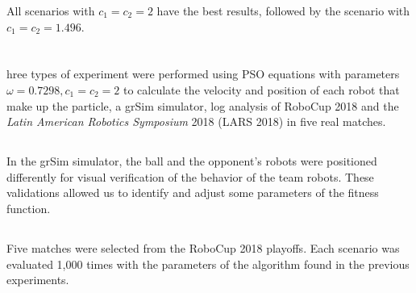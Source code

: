 \documentclass[a0,portrait]{sciposter}
\newcommand{\tituloA}[1]{\emph{\textbf{\color{white}{#1}}}}
\newcommand{\tituloB}[1]{\emph{\textbf{\color{blue}{#1}}}}
\begin{document}
\begin{multicols}{3}
    All scenarios with $c_1 = c_2 = 2$ have the best results, followed by the scenario with $c_1 = c_2 = 1.496$.
\\ %

\section*{\tituloA{Experiments}}
    hree types of experiment were performed using PSO equations with parameters $\omega=0.7298, c_1=c_2=2$ to calculate the velocity and position of each robot that make up the particle, a grSim simulator, log analysis of RoboCup 2018 and the \emph{Latin American Robotics Symposium} 2018 (LARS 2018) in five real matches.
\\

\subsection*{\tituloB{Results -- Simulator}}
    In the grSim simulator, the ball and the opponent's robots were positioned differently for visual verification of the behavior of the team robots. These validations allowed us to identify and adjust some parameters of the fitness function.
\\

\subsection*{\tituloB{Results -- RoboCup 2018 playoffs}}
    Five matches were selected from the RoboCup 2018 playoffs. Each scenario was evaluated 1,000 times with the parameters of the algorithm found in the previous experiments.


    \begin{adjustbox}{width=1\linewidth, center}
\end{adjustbox}
\end{multicols}
\end{document}
